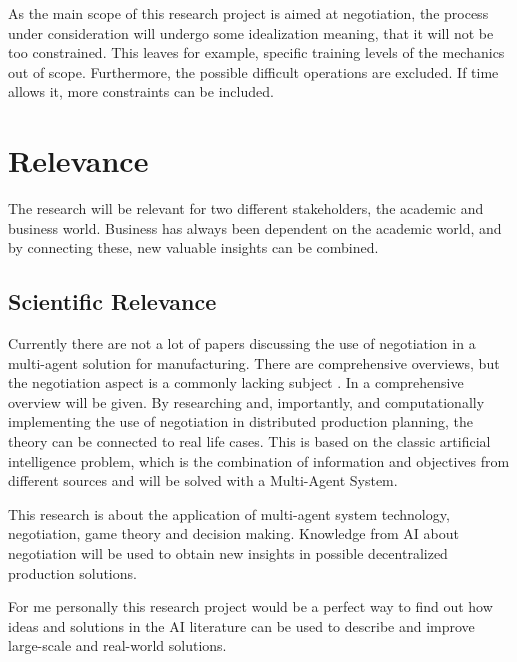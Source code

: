 As the main scope of this research project is aimed at negotiation, the process under consideration will undergo some idealization meaning, that it will not be too constrained. This leaves for example, specific training levels of the mechanics out of scope. Furthermore, the possible difficult operations are excluded.  If time allows it, more constraints can be included.

%

\section{Relevance}%
The research will be relevant for two different stakeholders, the academic and business world. Business has always been dependent on the academic world, and by connecting these, new valuable insights can be combined.
\subsection{Scientific Relevance}
Currently there are not a lot of papers discussing the use of negotiation in a multi-agent solution for manufacturing. There are comprehensive overviews, but the negotiation aspect is a commonly lacking subject \citep{leitao2009agent}. In  a comprehensive overview will be given. By researching and, importantly, and computationally implementing the use of negotiation in distributed production planning, the theory can be connected to real life cases. This is based on the classic artificial intelligence problem, which is the combination of information and objectives from different sources and will be solved with a Multi-Agent System. 

This research is about the application of multi-agent system technology, negotiation, game theory and decision making. Knowledge from AI about negotiation will be used to obtain new insights in possible decentralized production solutions.  

For me personally this research project would be a perfect way to find out how ideas and solutions in the AI literature can be used to describe and improve large-scale and real-world solutions.
